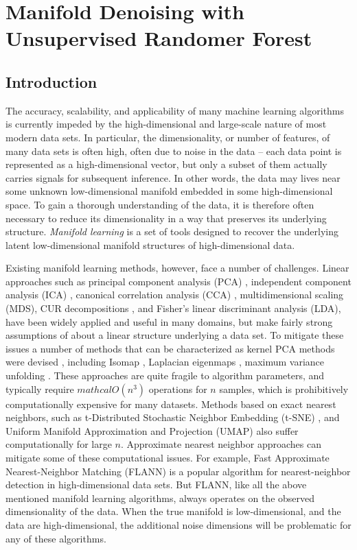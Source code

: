 \chapter{Manifold Denoising with Unsupervised Randomer Forest}
\label{sec:DURerF}


\section{Introduction}
The accuracy, scalability, and applicability of many machine learning algorithms is currently impeded by the high-dimensional and large-scale nature of most modern data sets. In particular, the dimensionality, or number of features, of many data sets is often  high, often due to noise in the data -- each data point is represented as a high-dimensional vector, but only a subset of them actually carries signals for subsequent inference.
In other words, the data may lives near some unknown low-dimensional manifold embedded in some high-dimensional space. 
To gain a thorough understanding of the data, it is therefore often necessary to reduce its dimensionality in a way that preserves its underlying structure. \textit{Manifold learning} is a set of tools designed to recover the underlying latent low-dimensional manifold structures of high-dimensional data.

Existing manifold learning methods, however, face a number of challenges.  Linear approaches such as principal component analysis (PCA) \cite{pearson1901}, independent component analysis (ICA) \cite{hyvarinen2000independent}, canonical correlation analysis (CCA) \cite{hotelling1936relations}, multidimensional scaling (MDS)\cite{cox2000multidimensional}, CUR decompositions \cite{mahoney2009cur}, and Fisher's linear discriminant analysis (LDA), have been widely applied and useful in many domains, but make fairly strong assumptions of about a linear structure underlying a data set. To mitigate these issues a number of methods that can be characterized as kernel PCA methods were devised \cite{scholkopf1997kernel}, including  Isomap \cite{tenenbaum2000global}, Laplacian eigenmaps \cite{belkin2002laplacian}, maximum variance unfolding \cite{weinberger2006unsupervised}. These approaches are quite fragile to algorithm parameters, and typically require $mathcal{O}(n^3)$ operations for $n$ samples, which is prohibitively computationally expensive for many datasets.  Methods based on exact nearest neighbors, such as t-Distributed Stochastic Neighbor Embedding (t-SNE) \cite{maaten2008visualizing}, and
Uniform
Manifold Approximation and Projection (UMAP) \cite{mcinnes2018umap} also suffer computationally for large $n$. Approximate nearest neighbor approaches can mitigate some of these computational issues.  For example, Fast Approximate Nearest-Neighbor Matching (FLANN) \cite{muja2014scalable} is a popular 
algorithm for nearest-neighbor detection in high-dimensional data sets. But FLANN, like all the above mentioned manifold learning algorithms, always operates on the observed dimensionality of the data.  When the true manifold is low-dimensional, and the data are high-dimensional, the additional noise dimensions will be problematic for any of these algorithms.


